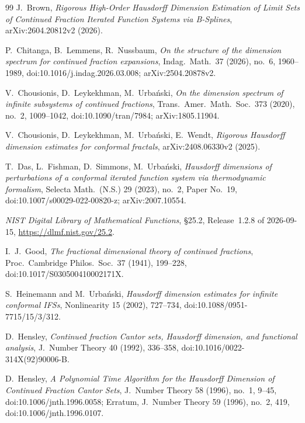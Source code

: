 \documentclass[11pt]{article}
\theoremstyle{definition}
\theoremstyle{remark}
\begin{document}
\begin{thebibliography}{99}
 J.~Brown, \emph{Rigorous High-Order Hausdorff Dimension
Estimation of Limit Sets of Continued Fraction Iterated Function Systems via
B-Splines}, arXiv:2604.20812v2 (2026).

 P.~Chitanga, B.~Lemmens, R.~Nussbaum, \emph{On the structure
of the dimension spectrum for continued fraction expansions}, Indag.\ Math.\
37 (2026), no.~6, 1960--1989, doi:10.1016/j.indag.2026.03.008;
arXiv:2504.20878v2.

 V.~Chousionis, D.~Leykekhman, M.~Urba\'nski, \emph{On the
dimension spectrum of infinite subsystems of continued fractions},
Trans.\ Amer.\ Math.\ Soc.\ 373 (2020), no.~2, 1009--1042,
doi:10.1090/tran/7984; arXiv:1805.11904.

 V.~Chousionis, D.~Leykekhman, M.~Urba\'nski, E.~Wendt,
\emph{Rigorous Hausdorff dimension estimates for conformal fractals},
arXiv:2408.06330v2 (2025).

{\sloppy
{} T.~Das, L.~Fishman, D.~Simmons, M.~Urba\'nski, \emph{Hausdorff
dimensions of perturbations of a conformal iterated function system via
thermodynamic formalism}, Selecta Math.\ (N.S.) 29 (2023), no.~2, Paper No.~19,
doi:10.1007/s00029-022-00820-z; arXiv:2007.10554.
}

 \emph{NIST Digital Library of Mathematical Functions}, \S25.2,
Release~1.2.8 of 2026-09-15, \url{https://dlmf.nist.gov/25.2}.

{\sloppy
{} I.~J.~Good, \emph{The fractional dimensional theory of
continued fractions}, Proc.\ Cambridge Philos.\ Soc.\ 37 (1941), 199--228,
doi:10.1017/S030500410002171X.
}

{\sloppy
{} S.~Heinemann and M.~Urba\'nski, \emph{Hausdorff dimension
estimates for infinite conformal IFSs}, Nonlinearity 15 (2002), 727--734,
doi:10.1088/0951-7715/15/3/312.
}

{\sloppy
{} D.~Hensley, \emph{Continued fraction Cantor sets,
Hausdorff dimension, and functional analysis}, J.\ Number Theory 40 (1992),
336--358, doi:10.1016/0022-314X(92)90006-B.
}

 D.~Hensley, \emph{A Polynomial Time Algorithm for the
Hausdorff Dimension of Continued Fraction Cantor Sets}, J.\ Number Theory 58
(1996), no.~1, 9--45, doi:10.1006/jnth.1996.0058; Erratum, J.\ Number Theory
59 (1996), no.~2, 419, doi:10.1006/jnth.1996.0107.


\end{thebibliography}
\end{document}
